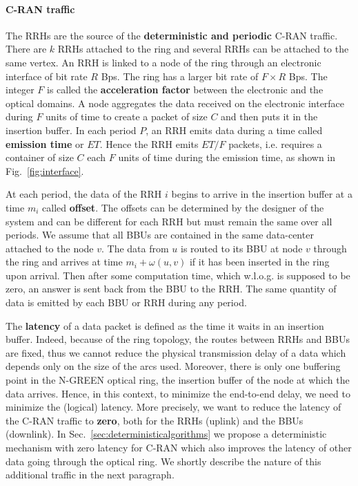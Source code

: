 \documentclass[10pt, conference, letterpaper]{IEEEtran}
\begin{document}
     \paragraph{C-RAN traffic}
   
   The RRHs are the source of the {\bf deterministic and periodic} C-RAN traffic.
   There are $k$ RRHs attached to the ring and several RRHs can be attached to the same vertex. An RRH is linked to a node of the ring through an electronic interface of bit rate $R$ Bps.
   The ring has a larger bit rate of $F\times R$ Bps. The integer $F$ is called the {\bf acceleration factor} between the electronic and the optical domains. A node aggregates the data received on the electronic interface during $F$ units of time to create a packet of size $C$ and then puts it in the insertion buffer.
  In each period $P$, an RRH emits data during a time called \textbf{emission time} or $ET$. Hence the RRH emits $ET / F$ packets, i.e. requires a container of size $C$ each $F$ units of time during the emission time, as shown in Fig.~\ref{fig:interface}.
   
   At each period, the data of the RRH $i$ begins to arrive in the insertion buffer at a time $m_i$  called {\bf offset}. The offsets can be determined by the designer of the system and can be different for each RRH but must remain the same over all periods. We assume that all BBUs are contained in the same data-center attached to the node $v$. The data from $u$ is routed to its BBU at node $v$ through the ring and arrives at time $m_i + \omega(u,v)$ if it has been inserted in the ring upon arrival. Then after some computation time, which w.l.o.g. is supposed to be zero, an answer is sent back from the BBU to the RRH. The same quantity of data is emitted by each BBU or RRH during any period.
   
   The {\bf latency} of a data packet is defined as the time it waits in an insertion buffer.
   Indeed, because of the ring topology, the routes between RRHs and BBUs are fixed, thus we cannot reduce the physical transmission delay of a data which depends only on the size of the arcs used. Moreover, there is only one buffering point in the N-GREEN optical ring, the insertion buffer of the node at which the data arrives. Hence, in this context, to minimize the end-to-end delay, we need to minimize the (logical) latency.
   More precisely, we want to reduce the latency of the C-RAN traffic to \textbf{zero}, both for the RRHs (uplink) and the BBUs (downlink). In Sec.~\ref{sec:deterministicalgorithms} we propose a deterministic mechanism with zero latency for C-RAN which also improves the latency of other data going through the optical ring. We shortly describe the nature of this additional traffic in the next paragraph.
    
\end{document}
